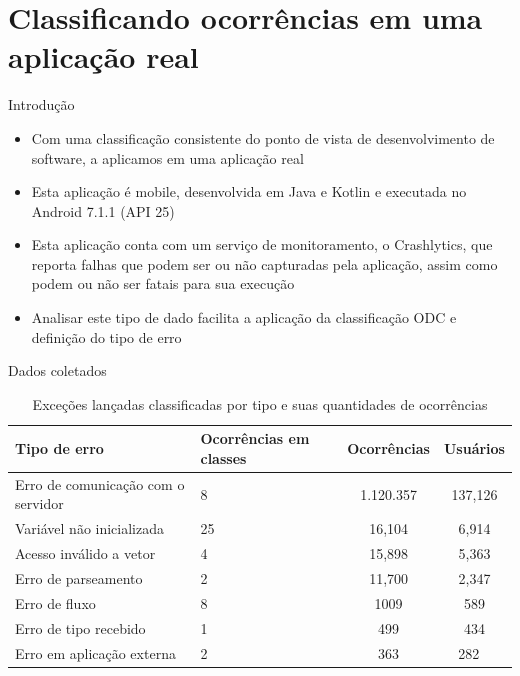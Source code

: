 \documentclass[brazilian]{beamer}
\begin{document}
\section{Classificando ocorrências em uma aplicação real}

\begin{frame}{Introdução}
    \begin{itemize}
        \item Com uma classificação consistente do ponto de vista de desenvolvimento de software, a aplicamos em uma aplicação real
        \item Esta aplicação é mobile, desenvolvida em Java e Kotlin e executada no Android 7.1.1 (API 25)
        \item Esta aplicação conta com um serviço de monitoramento, o Crashlytics, que reporta falhas que podem ser ou não capturadas pela aplicação, assim como podem ou não ser fatais para sua execução
        \item Analisar este tipo de dado facilita a aplicação da classificação ODC e definição do tipo de erro
    \end{itemize}
\end{frame}

\begin{frame}{Dados coletados}
    \begin{table}[H]
        \centering
        \begin{tabularx}{\textwidth}{ l|X|c|c }
            \textbf{Tipo de erro} & \textbf{Ocorrências em classes} & \textbf{Ocorrências} & \textbf{Usuários} \\
            \hline
            Erro de comunicação com o servidor & 8 & 1.120.357 & 137,126 \\
            Variável não inicializada & 25 & 16,104 & 6,914 \\
            Acesso inválido a vetor & 4 & 15,898 & 5,363 \\
            Erro de parseamento & 2 & 11,700 & 2,347 \\
            Erro de fluxo & 8 & 1009 & 589 \\
            Erro de tipo recebido & 1 & 499 & 434 \\
            Erro em aplicação externa & 2 & 363 & 282 \
        \end{tabularx}
        \caption{Exceções lançadas classificadas por tipo e suas quantidades de ocorrências}
        \label{table:exceptions_classification}
    \end{table}
\end{frame}
\end{document}
